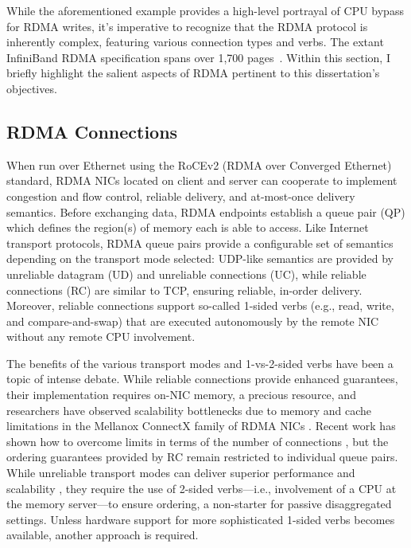 \documentclass[12pt]{ucsddissertation}
\begin{document}
While the aforementioned example provides a high-level portrayal of CPU bypass for RDMA writes, it's
imperative to recognize that the RDMA protocol is inherently complex, featuring various connection
types and verbs. The extant InfiniBand RDMA specification spans over 1,700
pages~\cite{infiniband-spec}. Within this section, I briefly highlight the salient aspects of RDMA
pertinent to this dissertation's objectives.

\subsection{RDMA Connections}


When run over Ethernet using the RoCEv2 (RDMA over Converged Ethernet) standard, RDMA NICs located
on client and server can cooperate to implement congestion \cite{hpcc,dcqcn} and flow control,
reliable delivery, and at-most-once delivery semantics. Before exchanging data, RDMA endpoints
establish a queue pair (QP) which defines the region(s) of memory each is able to access. Like
Internet transport protocols, RDMA queue pairs provide a configurable set of semantics depending on
the transport mode selected: UDP-like semantics are provided by unreliable datagram (UD) and
unreliable connections (UC), while reliable connections (RC) are similar to TCP, ensuring reliable,
in-order delivery. Moreover, reliable connections support so-called 1-sided verbs (e.g., read,
write, and compare-and-swap) that are executed autonomously by the remote NIC without any remote CPU
involvement.

The benefits of the various transport modes and 1-vs-2-sided verbs have been a topic of intense
debate. While reliable connections provide enhanced guarantees, their implementation requires on-NIC
memory, a precious resource, and researchers have observed scalability bottlenecks due to memory and
cache limitations in the Mellanox ConnectX family of RDMA NICs
\cite{farm,fasst,erpc,lite,design-guidelines}. Recent work has shown how to overcome limits in terms
of the number of connections \cite{storm,flock}, but the ordering guarantees provided by RC remain
restricted to individual queue pairs. While unreliable transport modes can deliver superior
performance and scalability \cite{fasst}, they require the use of 2-sided verbs---i.e., involvement
of a CPU at the memory server---to ensure ordering, a non-starter for passive disaggregated
settings. Unless hardware support for more sophisticated 1-sided verbs \cite{filemr,rma,star}
becomes available, another approach is required.
\end{document}
